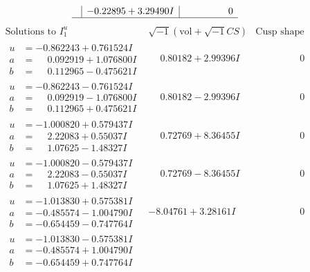\documentclass[1p]{elsarticle_modified}
\theoremstyle{definition}
\newcommand{\I}{\sqrt{-1}}
\begin{document}
$$\begin{array}{c|c|c}
 & -0.22895 + 3.29490 I & \phantom{-0.000000 } 0\\
 \hline 
 \end{array}$$\newpage$$\begin{array}{c|c|c}  
\text{Solutions to }I^u_{1}& \I (\text{vol} + \sqrt{-1}CS) & \text{Cusp shape}\\
 \hline 
\begin{aligned}
u &= -0.862243 + 0.761524 I \\
a &= \phantom{-}0.092919 + 1.076800 I \\
b &= \phantom{-}0.112965 - 0.475621 I\end{aligned}
 & \phantom{-}0.80182 + 2.99396 I & \phantom{-0.000000 } 0 \\ \hline\begin{aligned}
u &= -0.862243 - 0.761524 I \\
a &= \phantom{-}0.092919 - 1.076800 I \\
b &= \phantom{-}0.112965 + 0.475621 I\end{aligned}
 & \phantom{-}0.80182 - 2.99396 I & \phantom{-0.000000 } 0 \\ \hline\begin{aligned}
u &= -1.000820 + 0.579437 I \\
a &= \phantom{-}2.22083 + 0.55037 I \\
b &= \phantom{-}1.07625 - 1.48327 I\end{aligned}
 & \phantom{-}0.72769 + 8.36455 I & \phantom{-0.000000 } 0 \\ \hline\begin{aligned}
u &= -1.000820 - 0.579437 I \\
a &= \phantom{-}2.22083 - 0.55037 I \\
b &= \phantom{-}1.07625 + 1.48327 I\end{aligned}
 & \phantom{-}0.72769 - 8.36455 I & \phantom{-0.000000 } 0 \\ \hline\begin{aligned}
u &= -1.013830 + 0.575381 I \\
a &= -0.485574 - 1.004790 I \\
b &= -0.654459 - 0.747764 I\end{aligned}
 & -8.04761 + 3.28161 I & \phantom{-0.000000 } 0 \\ \hline\begin{aligned}
u &= -1.013830 - 0.575381 I \\
a &= -0.485574 + 1.004790 I \\
b &= -0.654459 + 0.747764 I\end{aligned}

\end{array}$$
\end{document}
